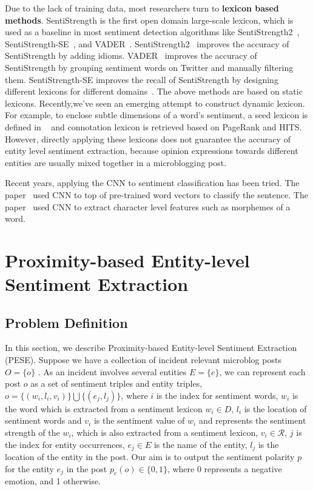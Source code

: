 \documentclass[runningheads]{llncs}
\begin{document}
Due to the lack of training data, most researchers turn to \textbf{lexicon based methods}. 
SentiStrength is the first open domain large-scale lexicon, which is used as a baseline in most sentiment detection algorithms like SentiStrength2~\cite{Thelwall2012lexicon}, SentiStrength-SE~\cite{Rakibul2017SentiStrength-SE}, and VADER~\cite{Hutto2014SSimproved}. 
SentiStrength2~\cite{Thelwall2012lexicon} improves the accuracy of SentiStrength by adding idioms. 
VADER~\cite{Hutto2014SSimproved} improves the accuracy of SentiStrength by grouping sentiment words on Twitter and manually filtering them. 
SentiStrength-SE improves the recall of SentiStrength by designing different lexicons for different domains~\cite{Rakibul2017SentiStrength-SE}. 
The above methods are based on static lexicons.
Recently,we've seen an emerging attempt to construct dynamic lexicon. 
For example, to enclose subtle dimensions of a word’s sentiment, a seed lexicon is defined in ~\cite{Feng2011lexicon} and connotation lexicon is retrieved based on PageRank and HITS. 
However, directly applying these lexicons does not guarantee the accuracy of entity level sentiment extraction, because opinion expressions towards different entities are usually mixed together in a microblogging post. 

Recent years, applying the CNN to sentiment classification has been tried. The paper~\cite{CNN1} used CNN to top of pre-trained word vectors to classify the sentence. The paper~\cite{CNN2} used CNN to extract character level features such as morphemes of a word.


\section{Proximity-based Entity-level Sentiment Extraction}\label{sec:sentiment classification}


\subsection{Problem Definition}
In this section, we describe Proximity-based Entity-level Sentiment Extraction (PESE). Suppose we have a collection of incident relevant microblog posts $O=\{o\}$ . As an incident involves several entities $E=\{e\}$, we can represent each post $o$ as a set of sentiment triples and entity triples, $o=\{(w_i,l_i,v_i)\}\bigcup \{(e_j,l_j)\}$, where $i$ is the index for sentiment words, $w_i$ is the word which is extracted from a sentiment lexicon $w_i\in D$,  $l_i$  is the location of sentiment words and $v_i$ is the sentiment value of $w_i$ and represents the sentiment strength of the $w_i$, which is also extracted from a sentiment lexicon, $v_i \in \mathcal{R}$,  $j$ is the index for entity occurrences, $e_j\in E$ is the name of the entity, $l_j$ is the location of the entity in the post. Our aim is to output the sentiment polarity $p$ for the entity $e_j$ in the post $p_e(o)\in\{0,1\}$, where 0 represents a negative emotion, and 1 otherwise.
\end{document}
